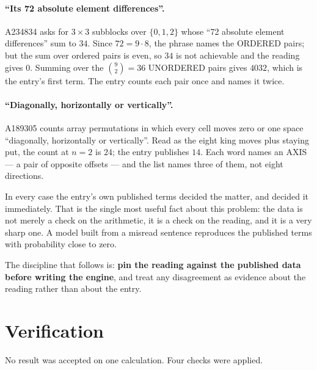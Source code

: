 \documentclass[11pt,a4paper]{article}
\theoremstyle{plain}
\theoremstyle{definition}
\begin{document}
\paragraph{``Its 72 absolute element differences''.}
A234834 asks for $3\times3$ subblocks over $\{0,1,2\}$ whose ``72 absolute element
differences'' sum to $34$. Since $72=9\cdot8$, the phrase names the ORDERED pairs; but the sum
over ordered pairs is even, so $34$ is not achievable and the reading gives $0$. Summing over
the $\binom92=36$ UNORDERED pairs gives $4032$, which is the entry's first term. The entry
counts each pair once and names it twice.

\paragraph{``Diagonally, horizontally or vertically''.}
A189305 counts array permutations in which every cell moves zero or one space ``diagonally,
horizontally or vertically''. Read as the eight king moves plus staying put, the count at $n=2$
is $24$; the entry publishes $14$. Each word names an AXIS --- a pair of opposite offsets ---
and the list names three of them, not eight directions.

In every case the entry's own published terms decided the matter, and decided it immediately.
That is the single most useful fact about this problem: the data is not merely a check on the
arithmetic, it is a check on the reading, and it is a very sharp one. A model built from a
misread sentence reproduces the published terms with probability close to zero.

The discipline that follows is: \textbf{pin the reading against the published data before
writing the engine}, and treat any disagreement as evidence about the reading rather than about
the entry.

\section{Verification}

No result was accepted on one calculation. Four checks were applied.
\end{document}
